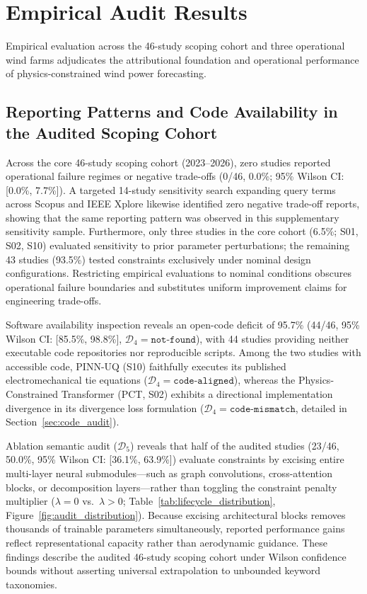 \section{Empirical Audit Results}
\label{sec:results}

Empirical evaluation across the 46-study scoping cohort and three operational wind farms adjudicates the attributional foundation and operational performance of physics-constrained wind power forecasting.

\subsection{Reporting Patterns and Code Availability in the Audited Scoping Cohort}
Across the core 46-study scoping cohort (2023--2026), zero studies reported operational failure regimes or negative trade-offs (0/46, 0.0\%; 95\% Wilson CI: [0.0\%, 7.7\%]). A targeted 14-study sensitivity search expanding query terms across Scopus and IEEE Xplore likewise identified zero negative trade-off reports, showing that the same reporting pattern was observed in this supplementary sensitivity sample. Furthermore, only three studies in the core cohort (6.5\%; S01, S02, S10) evaluated sensitivity to prior parameter perturbations; the remaining 43 studies (93.5\%) tested constraints exclusively under nominal design configurations. Restricting empirical evaluations to nominal conditions obscures operational failure boundaries and substitutes uniform improvement claims for engineering trade-offs.

Software availability inspection reveals an open-code deficit of 95.7\% (44/46, 95\% Wilson CI: [85.5\%, 98.8\%], $\mathcal{D}_4 = \texttt{not-found}$), with 44 studies providing neither executable code repositories nor reproducible scripts. Among the two studies with accessible code, PINN-UQ (S10) faithfully executes its published electromechanical tie equations ($\mathcal{D}_4 = \texttt{code-aligned}$), whereas the Physics-Constrained Transformer (PCT, S02) exhibits a directional implementation divergence in its divergence loss formulation ($\mathcal{D}_4 = \texttt{code-mismatch}$, detailed in Section~\ref{sec:code_audit}).

Ablation semantic audit ($\mathcal{D}_5$) reveals that half of the audited studies (23/46, 50.0\%, 95\% Wilson CI: [36.1\%, 63.9\%]) evaluate constraints by excising entire multi-layer neural submodules---such as graph convolutions, cross-attention blocks, or decomposition layers---rather than toggling the constraint penalty multiplier ($\lambda=0$ vs.\ $\lambda>0$; Table~\ref{tab:lifecycle_distribution}, Figure~\ref{fig:audit_distribution}). Because excising architectural blocks removes thousands of trainable parameters simultaneously, reported performance gains reflect representational capacity rather than aerodynamic guidance. These findings describe the audited 46-study scoping cohort under Wilson confidence bounds without asserting universal extrapolation to unbounded keyword taxonomies.

